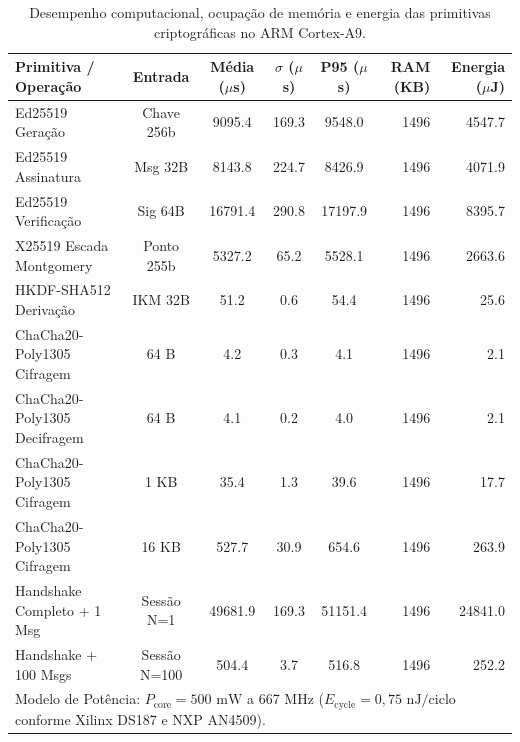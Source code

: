 
\begin{table}[htbp]
\centering
\caption{Desempenho computacional, ocupação de memória e energia das primitivas criptográficas no ARM Cortex-A9.}
\label{tab:desempenho_primitivas_cortex_a9}
\begin{tabular}{lccccrr}
\hline
\textbf{Primitiva / Operação} & \textbf{Entrada} & \textbf{Média ($\mu$s)} & \textbf{$\sigma$ ($\mu$s)} & \textbf{P95 ($\mu$s)} & \textbf{RAM (KB)} & \textbf{Energia ($\mu$J)} \\
\hline
Ed25519 Geração & Chave 256b & 9095.4 & 169.3 & 9548.0 & 1496 & 4547.7 \\
Ed25519 Assinatura & Msg 32B & 8143.8 & 224.7 & 8426.9 & 1496 & 4071.9 \\
Ed25519 Verificação & Sig 64B & 16791.4 & 290.8 & 17197.9 & 1496 & 8395.7 \\
X25519 Escada Montgomery & Ponto 255b & 5327.2 & 65.2 & 5528.1 & 1496 & 2663.6 \\
HKDF-SHA512 Derivação & IKM 32B & 51.2 & 0.6 & 54.4 & 1496 & 25.6 \\
ChaCha20-Poly1305 Cifragem & 64 B & 4.2 & 0.3 & 4.1 & 1496 & 2.1 \\
ChaCha20-Poly1305 Decifragem & 64 B & 4.1 & 0.2 & 4.0 & 1496 & 2.1 \\
ChaCha20-Poly1305 Cifragem & 1 KB & 35.4 & 1.3 & 39.6 & 1496 & 17.7 \\
ChaCha20-Poly1305 Cifragem & 16 KB & 527.7 & 30.9 & 654.6 & 1496 & 263.9 \\
Handshake Completo + 1 Msg & Sessão N=1 & 49681.9 & 169.3 & 51151.4 & 1496 & 24841.0 \\
Handshake + 100 Msgs & Sessão N=100 & 504.4 & 3.7 & 516.8 & 1496 & 252.2 \\
\hline
\multicolumn{7}{l}{\footnotesize Modelo de Potência: $P_{\text{core}} = 500\text{ mW}$ a 667 MHz ($E_{\text{cycle}} = 0{,}75\text{ nJ/ciclo}$ conforme Xilinx DS187 e NXP AN4509).} \\
\end{tabular}
\end{table}

